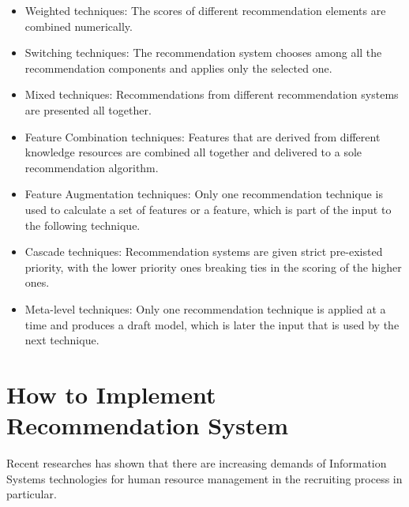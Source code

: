 \documentclass[sigconf]{acmart}
\begin{document}
\begin{itemize}
  \item Weighted techniques: The scores of different recommendation elements are combined numerically.
  \item Switching techniques: The recommendation system chooses among all the recommendation components and applies only  the selected one.\cite{Standford}
  \item Mixed techniques: Recommendations from different recommendation systems are presented all together.
  \item Feature Combination techniques: Features that are derived from different knowledge resources are combined all together and delivered to a sole recommendation algorithm.
  \item Feature Augmentation techniques: Only one recommendation technique is used to calculate a set of features or a feature, which is part of the input to the following technique.
  \item Cascade techniques: Recommendation systems are given strict pre-existed priority, with the lower priority ones breaking ties in the scoring of the higher ones.\cite{Standford}
  \item Meta-level techniques: Only one recommendation technique is applied at a time and produces a draft model, which is later the input that is used by the next technique.
\end{itemize}


\section{How to Implement Recommendation System}
Recent researches has shown that there are increasing demands of Information Systems technologies for human resource management in the recruiting process in particular. 
\end{document}

